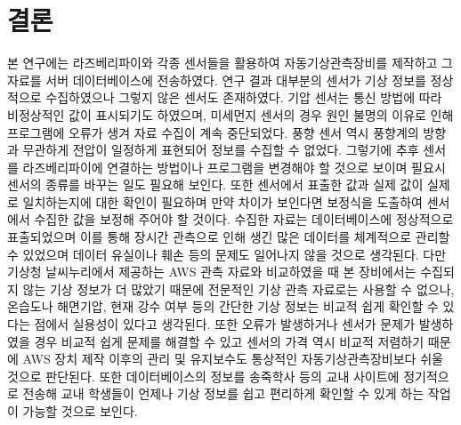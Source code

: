 \section{결론}

본 연구에는 라즈베리파이와 각종 센서들을 활용하여 자동기상관측장비를 제작하고 그 자료를 서버 데이터베이스에 전송하였다. 연구 결과 대부분의 센서가 기상 정보를 정상적으로 수집하였으나 그렇지 않은 센서도 존재하였다. 기압 센서는 통신 방법에 따라 비정상적인 값이 표시되기도 하였으며, 미세먼지 센서의 경우 원인 불명의 이유로 인해 프로그램에 오류가 생겨 자료 수집이 계속 중단되었다. 풍향 센서 역시 풍향계의 방향과 무관하게 전압이 일정하게 표현되어 정보를 수집할 수 없었다. 그렇기에 추후 센서를 라즈베리파이에 연결하는 방법이나 프로그램을 변경해야 할 것으로 보이며 필요시 센서의 종류를 바꾸는 일도 필요해 보인다. 또한 센서에서 표출한 값과 실제 값이 실제로 일치하는지에 대한 확인이 필요하며 만약 차이가 보인다면 보정식을 도출하여 센서에서 수집한 값을 보정해 주어야 할 것이다. 수집한 자료는 데이터베이스에 정상적으로 표출되었으며 이를 통해 장시간 관측으로 인해 생긴 많은 데이터를 체계적으로 관리할 수 있었으며 데이터 유실이나 훼손 등의 문제도 일어나지 않을 것으로 생각된다. 다만 기상청 날씨누리에서 제공하는 AWS 관측 자료와 비교하였을 때 본 장비에서는 수집되지 않는 기상 정보가 더 많았기 때문에 전문적인 기상 관측 자료로는 사용할 수 없으나, 온습도나 해면기압, 현재 강수 여부 등의 간단한 기상 정보는 비교적 쉽게 확인할 수 있다는 점에서 실용성이 있다고 생각된다. 또한 오류가 발생하거나 센서가 문제가 발생하였을 경우 비교적 쉽게 문제를 해결할 수 있고 센서의 가격 역시 비교적 저렴하기 때문에 AWS 장치 제작 이후의 관리 및 유지보수도 통상적인 자동기상관측장비보다 쉬울 것으로 판단된다. 또한 데이터베이스의 정보를 송죽학사 등의 교내 사이트에 정기적으로 전송해 교내 학생들이 언제나 기상 정보를 쉽고 편리하게 확인할 수 있게 하는 작업이 가능할 것으로 보인다.